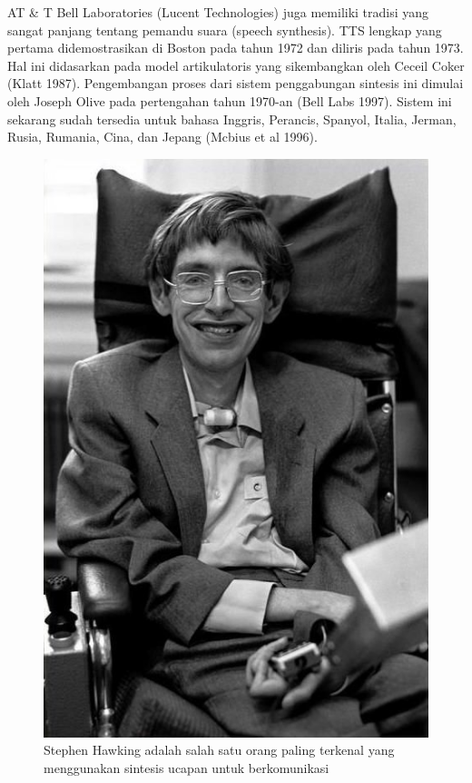 AT \& T Bell Laboratories (Lucent Technologies) juga memiliki tradisi yang sangat panjang tentang pemandu suara (speech synthesis). TTS lengkap yang pertama didemostrasikan di Boston pada tahun 1972 dan diliris pada tahun 1973. Hal ini didasarkan pada model artikulatoris yang sikembangkan oleh Ceceil Coker (Klatt 1987). Pengembangan proses dari sistem penggabungan sintesis ini dimulai oleh Joseph Olive pada pertengahan tahun 1970-an (Bell Labs 1997). Sistem ini sekarang sudah tersedia untuk bahasa Inggris, Perancis, Spanyol, Italia, Jerman, Rusia, Rumania, Cina, dan Jepang (Mcbius et al 1996).

\begin{figure}[H]
        \centerline{\includegraphics[scale=.45]{figures/stephan}}
        \caption{Stephen Hawking adalah salah satu orang paling terkenal yang menggunakan sintesis ucapan untuk berkomunikasi}
		\label{stephan}
\end{figure}

